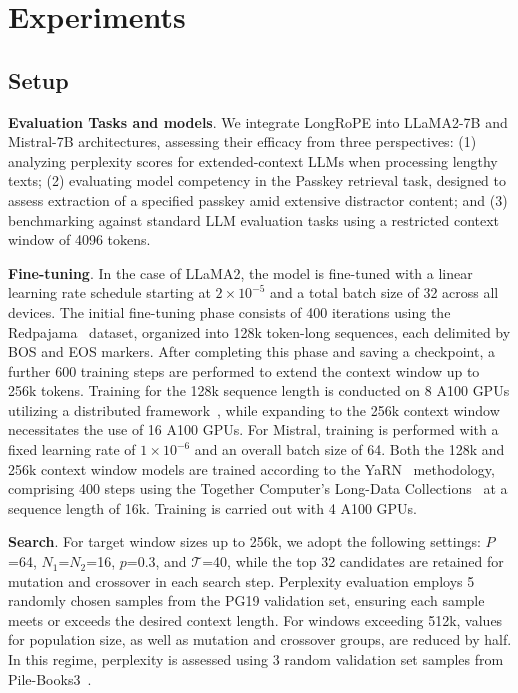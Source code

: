  \section{Experiments}

\label{sec:exp}
\subsection{Setup}
\textbf{Evaluation Tasks and models}. We integrate LongRoPE into LLaMA2-7B and Mistral-7B architectures, assessing their efficacy from three perspectives: (1) analyzing perplexity scores for extended-context LLMs when processing lengthy texts; (2) evaluating model competency in the Passkey retrieval task, designed to assess extraction of a specified passkey amid extensive distractor content; and (3) benchmarking against standard LLM evaluation tasks using a restricted context window of 4096 tokens.

\textbf{Fine-tuning}. In the case of LLaMA2, the model is fine-tuned with a linear learning rate schedule starting at $2 \times 10^{-5}$ and a total batch size of 32 across all devices. The initial fine-tuning phase consists of 400 iterations using the Redpajama~\cite{redpajama} dataset, organized into 128k token-long sequences, each delimited by BOS and EOS markers. After completing this phase and saving a checkpoint, a further 600 training steps are performed to extend the context window up to 256k tokens. Training for the 128k sequence length is conducted on 8 A100 GPUs utilizing a distributed framework~\cite{cube}, while expanding to the 256k context window necessitates the use of 16 A100 GPUs. For Mistral, training is performed with a fixed learning rate of $1 \times 10^{-6}$ and an overall batch size of 64. Both the 128k and 256k context window models are trained according to the YaRN~\cite{yarn} methodology, comprising 400 steps using the Together Computer’s Long-Data Collections~\cite{mistraldata} at a sequence length of 16k. Training is carried out with 4 A100 GPUs.

\textbf{Search}. For target window sizes up to 256k, we adopt the following settings: $P$=64, $N_1$=$N_2$=16, $p$=0.3, and $\mathcal{T}$=40, while the top 32 candidates are retained for mutation and crossover in each search step. Perplexity evaluation employs 5 randomly chosen samples from the PG19 validation set, ensuring each sample meets or exceeds the desired context length. For windows exceeding 512k, values for population size, as well as mutation and crossover groups, are reduced by half. In this regime, perplexity is assessed using 3 random validation set samples from Pile-Books3~\cite{pile}.

